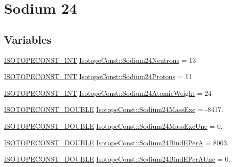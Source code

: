 \hypertarget{group___isotope_const-_sodium-_na24}{}\section{Sodium 24}
\label{group___isotope_const-_sodium-_na24}
\subsection*{Variables}
\begin{DoxyCompactItemize}
\item 
\mbox{\hyperlink{group___isotope_const-_macros_ga5f18360b3e99483a35c32d789e62621c}{I\+S\+O\+T\+O\+P\+E\+C\+O\+N\+S\+T\+\_\+\+I\+NT}} \mbox{\hyperlink{group___isotope_const-_sodium-_na24_ga853191ab0a0f520b894e36bb4ab803a5}{Isotope\+Const\+::\+Sodium24\+Neutrons}} = 13
\item 
\mbox{\hyperlink{group___isotope_const-_macros_ga5f18360b3e99483a35c32d789e62621c}{I\+S\+O\+T\+O\+P\+E\+C\+O\+N\+S\+T\+\_\+\+I\+NT}} \mbox{\hyperlink{group___isotope_const-_sodium-_na24_ga3922c66be700d0cef1dd8de1743c5f6f}{Isotope\+Const\+::\+Sodium24\+Protons}} = 11
\item 
\mbox{\hyperlink{group___isotope_const-_macros_ga5f18360b3e99483a35c32d789e62621c}{I\+S\+O\+T\+O\+P\+E\+C\+O\+N\+S\+T\+\_\+\+I\+NT}} \mbox{\hyperlink{group___isotope_const-_sodium-_na24_gab20d65a10f0068358b1600c76f66f694}{Isotope\+Const\+::\+Sodium24\+Atomic\+Weight}} = 24
\item 
\mbox{\hyperlink{group___isotope_const-_macros_ga8f45a7272ce02c0b4c65c44636ed719a}{I\+S\+O\+T\+O\+P\+E\+C\+O\+N\+S\+T\+\_\+\+D\+O\+U\+B\+LE}} \mbox{\hyperlink{group___isotope_const-_sodium-_na24_ga7f5151cbc797e4ee72db910c46bb6147}{Isotope\+Const\+::\+Sodium24\+Mass\+Exc}} = -\/8417.
\item 
\mbox{\hyperlink{group___isotope_const-_macros_ga8f45a7272ce02c0b4c65c44636ed719a}{I\+S\+O\+T\+O\+P\+E\+C\+O\+N\+S\+T\+\_\+\+D\+O\+U\+B\+LE}} \mbox{\hyperlink{group___isotope_const-_sodium-_na24_gaaac40e1dbbc92ab24cf280d691c58843}{Isotope\+Const\+::\+Sodium24\+Mass\+Exc\+Unc}} = 0.
\item 
\mbox{\hyperlink{group___isotope_const-_macros_ga8f45a7272ce02c0b4c65c44636ed719a}{I\+S\+O\+T\+O\+P\+E\+C\+O\+N\+S\+T\+\_\+\+D\+O\+U\+B\+LE}} \mbox{\hyperlink{group___isotope_const-_sodium-_na24_gab995cd15dba58271344996f6c73dbd97}{Isotope\+Const\+::\+Sodium24\+Bind\+E\+PerA}} = 8063.
\item 
\mbox{\hyperlink{group___isotope_const-_macros_ga8f45a7272ce02c0b4c65c44636ed719a}{I\+S\+O\+T\+O\+P\+E\+C\+O\+N\+S\+T\+\_\+\+D\+O\+U\+B\+LE}} \mbox{\hyperlink{group___isotope_const-_sodium-_na24_ga9cb126241781ddfdfc602c0678a9b6e5}{Isotope\+Const\+::\+Sodium24\+Bind\+E\+Per\+A\+Unc}} = 0.

\end{DoxyCompactItemize}
